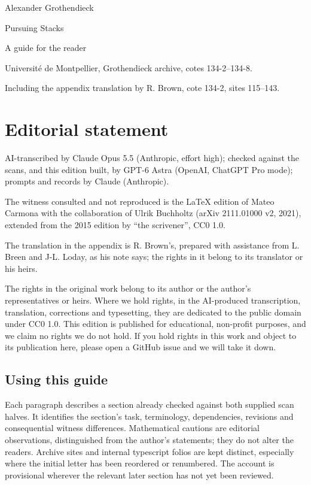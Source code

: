 \documentclass[10pt,oneside]{book}
\begin{document}
\hypersetup{pageanchor=false}
\begin{titlepage}\raggedright
{\Large Alexander Grothendieck\par}\vspace{12mm}
{\Huge Pursuing Stacks\par}\medskip{\LARGE 1983\par}\vspace{12mm}
{\Large A guide for the reader\par}\vspace{8mm}
{\large\EditionStatus\par}\vfill
Université de Montpellier, Grothendieck archive, cotes 134-2--134-8.\par
Including the appendix translation by R. Brown, cote 134-2, sites 115--143.\par
\end{titlepage}\hypersetup{pageanchor=true}
\chapter*{Editorial statement}

AI-transcribed by Claude Opus 5.5 (Anthropic, effort high); checked against the scans, and this edition built, by GPT-6 Astra (OpenAI, ChatGPT Pro mode); prompts and records by Claude (Anthropic).

The witness consulted and not reproduced is the LaTeX edition of Mateo Carmona with the collaboration of Ulrik Buchholtz (arXiv 2111.01000 v2, 2021), extended from the 2015 edition by ``the scrivener'', CC0 1.0.

The translation in the appendix is R. Brown's, prepared with assistance from L. Breen and J-L. Loday, as his note says; the rights in it belong to its translator or his heirs.

The rights in the original work belong to its author or the author's representatives or heirs. Where we hold rights, in the AI-produced transcription, translation, corrections and typesetting, they are dedicated to the public domain under CC0 1.0. This edition is published for educational, non-profit purposes, and we claim no rights we do not hold. If you hold rights in this work and object to its publication here, please open a GitHub issue and we will take it down.


\section*{Using this guide}
Each paragraph describes a section already checked against both supplied scan halves. It identifies the section's task, terminology, dependencies, revisions and consequential witness differences. Mathematical cautions are editorial observations, distinguished from the author's statements; they do not alter the readers. Archive sites and internal typescript folios are kept distinct, especially where the initial letter has been reordered or renumbered. The account is provisional wherever the relevant later section has not yet been reviewed.
\end{document}
